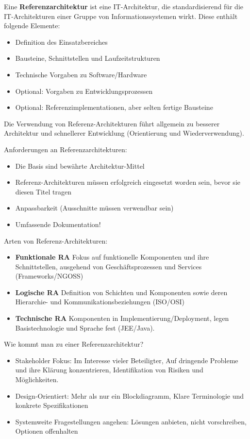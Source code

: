 Eine \textbf{Referenzarchitektur} ist eine IT-Architektur, die standardisierend für die IT-Architekturen einer Gruppe von Informationssystemen wirkt. Diese enthält folgende Elemente:
\begin{itemize}
	\item Definition des Einsatzbereiches
	\item Bausteine, Schnittstellen und Laufzeitstrukturen
	\item Technische Vorgaben zu Software/Hardware
	\item Optional: Vorgaben zu Entwicklungsprozessen
	\item Optional: Referenzimplementationen, aber selten fertige Bausteine
\end{itemize}

Die Verwendung von Referenz-Architekturen führt allgemein zu besserer Architektur und schnellerer Entwicklung (Orientierung und Wiederverwendung). 

Anforderungen an Referenzarchitekturen:
\begin{itemize}
	\item Die Basis sind bewährte Architektur-Mittel
	\item Referenz-Architekturen müssen erfolgreich eingesetzt worden sein, bevor sie diesen Titel tragen
	\item Anpassbarkeit (Ausschnitte müssen verwendbar sein)
	\item Umfassende Dokumentation!
\end{itemize}

Arten von Referenz-Architekturen:
\begin{itemize}
	\item \textbf{Funktionale RA} Fokus auf funktionelle Komponenten und ihre Schnittstellen, ausgehend von Geschäftsprozessen und Services (Frameworks/NGOSS)
	\item \textbf{Logische RA} Definition von Schichten und Komponenten sowie deren Hierarchie- und Kommunikationsbeziehungen (ISO/OSI)
	\item \textbf{Technische RA} Komponenten in Implementierung/Deployment, legen Basistechnologie und Sprache fest (JEE/Java).
\end{itemize}

Wie kommt man zu einer Referenzarchitektur?
\begin{itemize}
	\item Stakeholder Fokus: Im Interesse vieler Beteiligter, Auf dringende Probleme und ihre Klärung konzentrieren, Identifikation von Risiken und Möglichkeiten.
	
	\item Design-Orientiert: Mehr als nur ein Blockdiagramm, Klare Terminologie und konkrete Spezifikationen
	
	\item Systemweite Fragestellungen angehen: Lösungen anbieten, nicht vorschreiben, Optionen offenhalten
\end{itemize}

